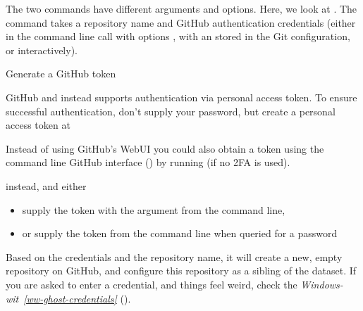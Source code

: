 \sphinxAtStartPar
The two commands have different arguments and options.
Here, we look at .
The command takes a repository name and GitHub authentication credentials
(either in the command line call with options , with an   stored in the Git
configuration, or interactively).

\ignorespaces \begin{importantnote}[label={index-13}, before title={\thetcbcounter\ }, check odd page=true]{Generate a GitHub token}
\label{\detokenize{basics/101-130-yodaproject:index-13}}

\sphinxAtStartPar
GitHub  and instead supports authentication via personal access token.
To ensure successful authentication, don’t supply your password, but create a personal access token at %
\begin{footnote}\sphinxAtStartFootnote
Instead of using GitHub’s WebUI you could also obtain a token using the command line GitHub interface () by running  (if no 2FA is used).
%
\end{footnote} instead, and either
\begin{itemize}
\item {} 
\sphinxAtStartPar
supply the token with the argument  from the command line,

\item {} 
\sphinxAtStartPar
or supply the token from the command line when queried for a password

\end{itemize}


\end{importantnote}

\sphinxAtStartPar
Based on the credentials and the
repository name, it will create a new, empty repository on GitHub, and
configure this repository as a sibling of the dataset.
If you are asked to enter a credential, and things feel weird, check
the \textit{Windows-wit}~{\windowswiticoninline}\textit{\ref{ww-ghost-credentials}} {\hyperref[\detokenize{basics/101-130-yodaproject:ww-ghost-credentials}]{}} ().

